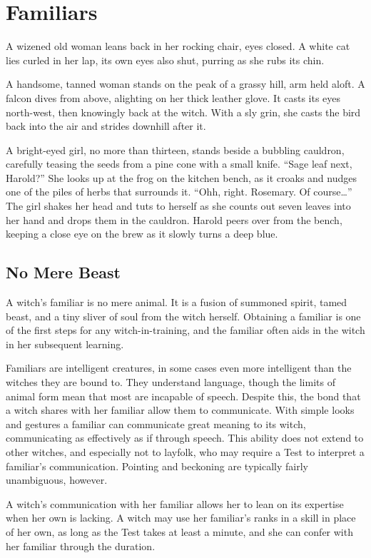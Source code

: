\chapter{Familiars}

A wizened old woman leans back in her rocking chair, eyes closed.
A white cat lies curled in her lap, its own eyes also shut, purring as she rubs its chin.

A handsome, tanned woman stands on the peak of a grassy hill, arm held aloft.
A falcon dives from above, alighting on her thick leather glove.
It casts its eyes north-west, then knowingly back at the witch.
With a sly grin, she casts the bird back into the air and strides downhill after it.

A bright-eyed girl, no more than thirteen, stands beside a bubbling cauldron, carefully teasing the seeds from a pine cone with a small knife.
``Sage leaf next, Harold?''
She looks up at the frog on the kitchen bench, as it croaks and nudges one of the piles of herbs that surrounds it.
``Ohh, right. Rosemary. Of course{\dots}''
The girl shakes her head and tuts to herself as she counts out seven leaves into her hand and drops them in the cauldron.
Harold peers over from the bench, keeping a close eye on the brew as it slowly turns a deep blue.

\section{No Mere Beast}

A witch's familiar is no mere animal.
It is a fusion of summoned spirit, tamed beast, and a tiny sliver of soul from the witch herself.
Obtaining a familiar is one of the first steps for any witch-in-training, and the familiar often aids in the witch in her subsequent learning.

Familiars are intelligent creatures, in some cases even more intelligent than the witches they are bound to.
They understand language, though the limits of animal form mean that most are incapable of speech.
Despite this, the bond that a witch shares with her familiar allow them to communicate.
With simple looks and gestures a familiar can communicate great meaning to its witch, communicating as effectively as if through speech.
This ability does not extend to other witches, and especially not to layfolk, who may require a Test to interpret a familiar's communication.
Pointing and beckoning are typically fairly unambiguous, however.

A witch's communication with her familiar allows her to lean on its expertise when her own is lacking.
A witch may use her familiar's ranks in a skill in place of her own, as long as the Test takes at least a minute, and she can confer with her familiar through the duration.

